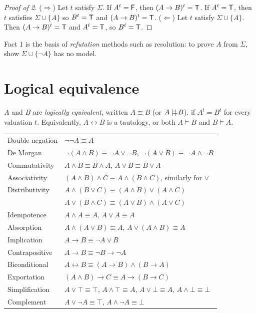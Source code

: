 \begin{proof}[Proof of 2]
($\Rightarrow$) Let $t$ satisfy $\Sigma$. If $A^t=\mathsf{F}$, then $(A\to B)^t=\mathsf{T}$. If
$A^t=\mathsf{T}$, then $t$ satisfies $\Sigma\cup\{A\}$ so $B^t=\mathsf{T}$ and $(A\to B)^t=\mathsf{T}$.
($\Leftarrow$) Let $t$ satisfy $\Sigma\cup\{A\}$. Then $(A\to B)^t=\mathsf{T}$ and $A^t=\mathsf{T}$,
so $B^t=\mathsf{T}$.
\end{proof}

Fact 1 is the basis of \emph{refutation} methods such as resolution: to prove $A$ from
$\Sigma$, show $\Sigma\cup\{\neg A\}$ has no model.

\section{Logical equivalence}

\begin{definition}
$A$ and $B$ are \emph{logically equivalent}, written $A\equiv B$ (or $A\mathrel{\models\!\!\!\mid} B$), if
$A^t=B^t$ for every valuation $t$. Equivalently, $A\leftrightarrow B$ is a tautology, or
both $A\models B$ and $B\models A$.
\end{definition}

\begin{important}
\begin{tabular}{@{}ll@{}}
Double negation & $\neg\neg A\equiv A$\\
De Morgan & $\neg(A\land B)\equiv\neg A\lor\neg B$, \quad $\neg(A\lor B)\equiv\neg A\land\neg B$\\
Commutativity & $A\land B\equiv B\land A$, \quad $A\lor B\equiv B\lor A$\\
Associativity & $(A\land B)\land C\equiv A\land(B\land C)$, similarly for $\lor$\\
Distributivity & $A\land(B\lor C)\equiv(A\land B)\lor(A\land C)$\\
 & $A\lor(B\land C)\equiv(A\lor B)\land(A\lor C)$\\
Idempotence & $A\land A\equiv A$, \quad $A\lor A\equiv A$\\
Absorption & $A\land(A\lor B)\equiv A$, \quad $A\lor(A\land B)\equiv A$\\
Implication & $A\to B\equiv\neg A\lor B$\\
Contrapositive & $A\to B\equiv\neg B\to\neg A$\\
Biconditional & $A\leftrightarrow B\equiv(A\to B)\land(B\to A)$\\
Exportation & $(A\land B)\to C\equiv A\to(B\to C)$\\
Simplification & $A\lor\top\equiv\top$, $A\land\top\equiv A$, $A\lor\bot\equiv A$,
  $A\land\bot\equiv\bot$\\
Complement & $A\lor\neg A\equiv\top$, \quad $A\land\neg A\equiv\bot$
\end{tabular}
\end{important}

